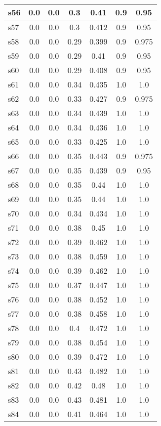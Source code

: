 \documentclass{article}
\begin{document}
\begin{tabular}{|l|c|c|c|c|c|c|}
\hline
s56 &0.0 & 0.0 & 0.3 & 0.41 & 0.9 & 0.95\\
\hline
s57 &0.0 & 0.0 & 0.3 & 0.412 & 0.9 & 0.95\\
\hline
s58 &0.0 & 0.0 & 0.29 & 0.399 & 0.9 & 0.975\\
\hline
s59 &0.0 & 0.0 & 0.29 & 0.41 & 0.9 & 0.95\\
\hline
s60 &0.0 & 0.0 & 0.29 & 0.408 & 0.9 & 0.95\\
\hline
s61 &0.0 & 0.0 & 0.34 & 0.435 & 1.0 & 1.0\\
\hline
s62 &0.0 & 0.0 & 0.33 & 0.427 & 0.9 & 0.975\\
\hline
s63 &0.0 & 0.0 & 0.34 & 0.439 & 1.0 & 1.0\\
\hline
s64 &0.0 & 0.0 & 0.34 & 0.436 & 1.0 & 1.0\\
\hline
s65 &0.0 & 0.0 & 0.33 & 0.425 & 1.0 & 1.0\\
\hline
s66 &0.0 & 0.0 & 0.35 & 0.443 & 0.9 & 0.975\\
\hline
s67 &0.0 & 0.0 & 0.35 & 0.439 & 0.9 & 0.95\\
\hline
s68 &0.0 & 0.0 & 0.35 & 0.44 & 1.0 & 1.0\\
\hline
s69 &0.0 & 0.0 & 0.35 & 0.44 & 1.0 & 1.0\\
\hline
s70 &0.0 & 0.0 & 0.34 & 0.434 & 1.0 & 1.0\\
\hline
s71 &0.0 & 0.0 & 0.38 & 0.45 & 1.0 & 1.0\\
\hline
s72 &0.0 & 0.0 & 0.39 & 0.462 & 1.0 & 1.0\\
\hline
s73 &0.0 & 0.0 & 0.38 & 0.459 & 1.0 & 1.0\\
\hline
s74 &0.0 & 0.0 & 0.39 & 0.462 & 1.0 & 1.0\\
\hline
s75 &0.0 & 0.0 & 0.37 & 0.447 & 1.0 & 1.0\\
\hline
s76 &0.0 & 0.0 & 0.38 & 0.452 & 1.0 & 1.0\\
\hline
s77 &0.0 & 0.0 & 0.38 & 0.458 & 1.0 & 1.0\\
\hline
s78 &0.0 & 0.0 & 0.4 & 0.472 & 1.0 & 1.0\\
\hline
s79 &0.0 & 0.0 & 0.38 & 0.454 & 1.0 & 1.0\\
\hline
s80 &0.0 & 0.0 & 0.39 & 0.472 & 1.0 & 1.0\\
\hline
s81 &0.0 & 0.0 & 0.43 & 0.482 & 1.0 & 1.0\\
\hline
s82 &0.0 & 0.0 & 0.42 & 0.48 & 1.0 & 1.0\\
\hline
s83 &0.0 & 0.0 & 0.43 & 0.481 & 1.0 & 1.0\\
\hline
s84 &0.0 & 0.0 & 0.41 & 0.464 & 1.0 & 1.0\\

\end{tabular}
\end{document}
